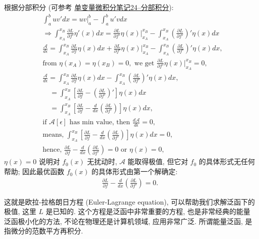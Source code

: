 \documentclass[cn,hazy,blue,14pt,screen]{./cls/elegantnote}
\begin{document}
根据分部积分 (可参考 \href{https://www.cnblogs.com/bigmonkey/p/7878995.html}{单变量微积分笔记24--分部积分}):
\begin{align*}
 	&\int_a^b uv' dx = uv|_a^b - \int_{a}^{b}u'vdx \\
 	&\Longrightarrow \int_{x_A}^{x_B}\frac{\partial L}{\partial f'}\eta'(x) dx = \frac{\partial L}{\partial f'}\eta(x)|_{x_A}^{x_B} - \int_{x_A}^{x_B}(\frac{\partial L}{\partial f'})' \eta(x)dx \\
 	&\frac{\mathcal{A}}{d\epsilon} = \int_{x_A}^{x_B}\frac{\partial L}{\partial f}\eta(x) dx + \frac{\partial L}{\partial f'}\eta(x) |_{x_A}^{x_B} - \int_{x_A}^{x_B}(\frac{\partial L}{\partial f'})'\eta(x) dx, \\
 	&\text{from } \eta(x_A)=\eta(x_B) = 0, \text{ we get } \frac{\partial L}{\partial f'}\eta(x) |_{x_A}^{x_B} = 0, \\
 	&\frac{\mathcal{A}}{d\epsilon} = \int_{x_A}^{x_B}\frac{\partial L}{\partial f}\eta(x) dx - \int_{x_A}^{x_B}(\frac{\partial L}{\partial f'})'\eta(x) dx, \\
 	&\hspace{1em} = \int_{x_A}^{x_B} \left[\frac{\partial L}{\partial f}- (\frac{\partial L}{\partial f'})' \right]\eta(x) dx \\
 	&\hspace{1em} = \int_{x_A}^{x_B} \left[\frac{\partial L}{\partial f}- \frac{d}{dx}(\frac{\partial L}{\partial f'}) \right]\eta(x) dx,\\
 	&\text{if } \mathcal{A}[\epsilon] \text{ has min value, then } \frac{d\mathcal{A}}{d\epsilon} = 0, \\
 	&\text{means, } \int_{x_A}^{x_B} \left[\frac{\partial L}{\partial f}- \frac{d}{dx}(\frac{\partial L}{\partial f'}) \right]\eta(x) dx = 0, \\
 	&\text{hence, } \frac{\partial L}{\partial f}- \frac{d}{dx}(\frac{\partial L}{\partial f'}) = 0 \text{  or  } \eta(x) = 0,
 \end{align*}
$ \eta(x)=0 $ 说明对 $ f_0(x) $ 无扰动时, $ \mathcal{A} $ 能取得极值, 但它对 $ f_0 $ 的具体形式无任何帮助; 因此最优函数 $ f_0(x) $ 的具体形式由第一个解确定:
\begin{align*}
 	\frac{\partial L}{\partial f}- \frac{d}{dx}(\frac{\partial L}{\partial f'}) = 0.
\end{align*}

这就是欧拉-拉格朗日方程 (Euler-Lagrange equation), 可以帮助我们求解泛函下的极值, 这里 $ L $ 是已知的. 这个方程是泛函中非常重要的方程, 也是非常经典的能量泛函极小化的方法, 不论在物理还是计算机领域, 应用非常广泛. 所谓能量泛函, 是指微分的范数平方再积分.
\end{document}
